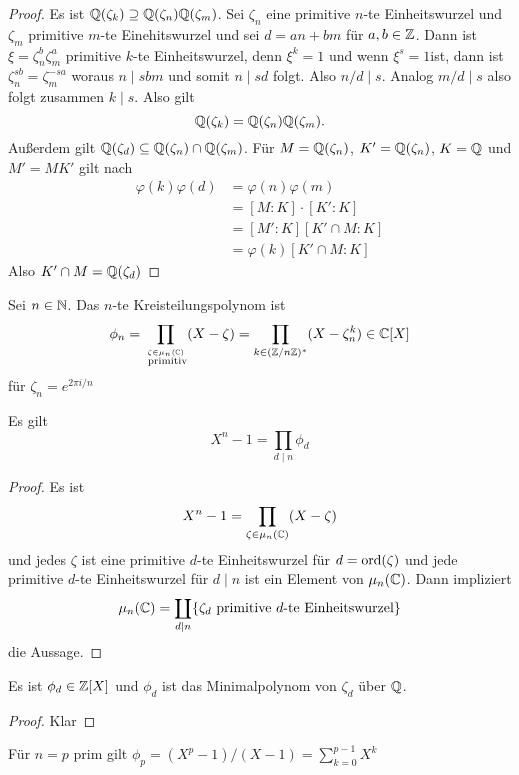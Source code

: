\begin{proof}
	Es ist \(\mathbb{Q}(\zeta_k)\supseteq\mathbb{Q}(\zeta_n)\mathbb{Q}(\zeta_m)\).
	Sei \(\zeta_n\) eine primitive \(n\)-te Einheitswurzel und \(\zeta_m\) primitive \(m\)-te Einehitswurzel und sei \(d=an+bm\) für \(a,b\in\mathbb{Z}\).
	Dann ist \(\xi=\zeta_n^b\zeta_m^a\) primitive \(k\)-te Einheitswurzel, denn \(\xi^k=1\) und wenn \(\xi^s=1\)ist, dann ist \(\zeta_n^{sb}=\zeta_m^{-sa}\) woraus \(n\mid sbm\) und somit \(n\mid sd\) folgt. Also \(n/d\mid s\). Analog \(m/d\mid s\) also folgt zusammen \(k\mid s\). Also gilt \[\mathbb{Q}(\zeta_k)=\mathbb{Q}(\zeta_n)\mathbb{Q}(\zeta_m).\] Außerdem gilt
	\(\mathbb{Q}(\zeta_d)\subseteq \mathbb{Q}(\zeta_n)\cap\mathbb{Q}(\zeta_m)\).
	Für \(M=\mathbb{Q}(\zeta_n)\), \(K'=\mathbb{Q}(\zeta_n)\), \(K=\mathbb{Q}\) und \(M'=MK'\) gilt nach 
	\begin{align*}
		\varphi(k)\varphi(d)&=\varphi(n)\varphi(m)\\
		&=[M:K]\cdot [K':K]\\
		&=[M':K][K'\cap M:K]\\
		&=\varphi(k)[K'\cap M:K]
	\end{align*}
	Also \(K'\cap M=\mathbb{Q}(\zeta_d)\)
\end{proof}
\begin{Def}
	Sei \(n\in\mathbb{N}\). Das \(n\)-te Kreisteilungspolynom ist \[\phi_n=\prod_{\stackrel{\zeta\in\mu_n(\mathbb{C})}{\text{ primitiv}}}(X-\zeta)=\prod_{k\in(\mathbb{Z}/n\mathbb{Z})^*}(X-\zeta_n^k)\in\mathbb{C}[X]\] für \(\zeta_n=e^{2\pi i/n}\)
\end{Def}
\begin{Lemma}
	Es gilt    \[X^n-1=\prod_{d\mid n}\phi_d\]
\end{Lemma}
\begin{proof}
	Es ist \[X^n-1=\prod_{\zeta\in\mu_n(\mathbb{C})}(X-\zeta)\] und jedes \(\zeta\) ist eine primitive \(d\)-te Einheitswurzel für \(d=\operatorname{ord}(\zeta)\) und jede primitive \(d\)-te Einheitswurzel für \(d\mid n\) ist ein Element von \(\mu_n(\mathbb{C})\).
	Dann impliziert \[\mu_n(\mathbb{C})=\coprod_{d\mid n}\{\zeta_d \text{ primitive \(d\)-te Einheitswurzel}\}\] die Aussage.
\end{proof}
\begin{Lemma}
	Es ist \(\phi_d\in\mathbb{Z}[X]\) und \(\phi_d\) ist das Minimalpolynom von \(\zeta_d\) über \(\mathbb{Q}\).
\end{Lemma}
\begin{proof}
	Klar
\end{proof}
\begin{Bem}
	Für \(n=p\) prim gilt \(\phi_p=(X^p-1)/(X-1)=\sum\limits_{k=0}^{p-1}X^k\)
\end{Bem}
